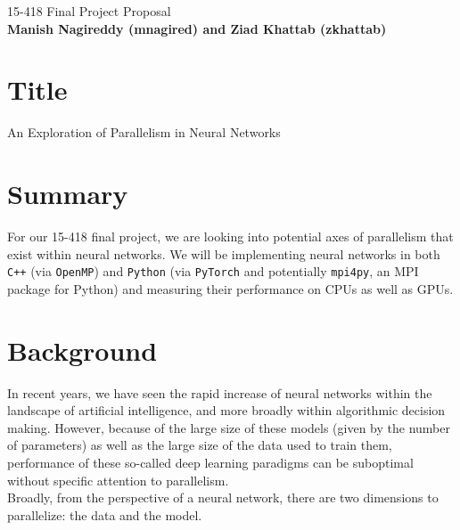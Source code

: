 \documentclass{article}
\begin{document}
\begin{center}

\Large{15-418 Final Project Proposal} \\
\vspace{1em}
\normalsize\textbf{Manish Nagireddy (mnagired) and Ziad Khattab (zkhattab)} \\
\vspace{1em}

\end{center}

\section*{Title}

An Exploration of Parallelism in Neural Networks

\section*{Summary}

For our 15-418 final project, we are looking into potential axes of parallelism that exist within neural networks. We will be implementing neural networks in both \texttt{C++} (via \texttt{OpenMP}) and \texttt{Python} (via \texttt{PyTorch} and potentially \texttt{mpi4py}, an MPI package for Python) and measuring their performance on CPUs as well as GPUs.

\section*{Background}

In recent years, we have seen the rapid increase of neural networks within the landscape of artificial intelligence, and more broadly within algorithmic decision making. However, because of the large size of these models (given by the number of parameters) as well as the large size of the data used to train them, performance of these so-called deep learning paradigms can be suboptimal without specific attention to parallelism. \\

Broadly, from the perspective of a neural network, there are two dimensions to parallelize: the data and the model.
\end{document}
